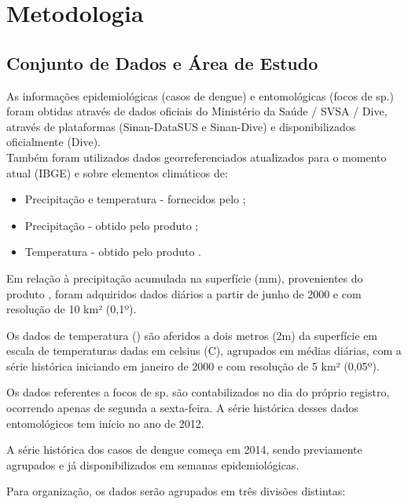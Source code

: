 \chapter{Metodologia}

\section{Conjunto de Dados e Área de Estudo}

As informações epidemiológicas (casos de dengue) e entomológicas (focos de  sp.) foram obtidas através de dados oficiais do Ministério da Saúde / \acrfull{SVSA} / \acrfull{Dive}, através de plataformas  (\acrshort{Sinan}-\acrshort{DataSUS} e \acrshort{Sinan}-\acrshort{Dive}) e disponibilizados oficialmente (\acrshort{Dive}).\\
\indent Também foram utilizados dados georreferenciados atualizados para o momento atual (\acrfull{IBGE}) e sobre elementos climáticos de:
\begin{itemize}
    \item Precipitação e temperatura - fornecidos pelo ;
    \item Precipitação - obtido pelo produto ;
    \item Temperatura - obtido pelo produto .
\end{itemize}

\indent Em relação à precipitação acumulada na superfície (mm), provenientes do produto , foram adquiridos dados diários a partir de junho de 2000 e com resolução de 10 km² (0,1º).

\indent Os dados de temperatura () são aferidos a dois metros (2m) da superfície em escala de temperaturas dadas em celsius (C), agrupados em médias diárias, com a série histórica iniciando em janeiro de 2000 e com resolução de 5 km² (0,05º).

\indent Os dados referentes a focos de  sp. são contabilizados no dia do próprio registro, ocorrendo apenas de segunda a sexta-feira. A série histórica desses dados entomológicos tem início no ano de 2012.

\indent A série histórica dos casos de dengue começa em 2014, sendo previamente agrupados e já disponibilizados em semanas epidemiológicas.

Para organização, os dados serão agrupados em três divisões distintas: 

